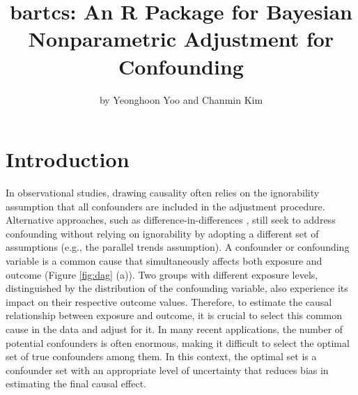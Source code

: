 \title{bartcs: An R Package for Bayesian Nonparametric Adjustment for Confounding}
\author{by Yeonghoon Yoo and Chanmin Kim}

\maketitle


\section{Introduction}


In observational studies, drawing causality often relies on the ignorability assumption \citep{rosenbaum_central_1983} that all confounders are included in the adjustment procedure. Alternative approaches, such as difference-in-differences \citep{abadie2005semiparametric}, still seek to address confounding without relying on ignorability by adopting a different set of assumptions (e.g., the parallel trends assumption). A confounder or confounding variable is a common cause that simultaneously affects both exposure and outcome (Figure \ref{fig:dag} (a)). Two groups with different exposure levels, distinguished by the distribution of the confounding variable, also experience its impact on their respective outcome values. Therefore, to estimate the causal relationship between exposure and outcome, it is crucial to select this common cause in the data and adjust for it. In many recent applications, the number of potential confounders is often enormous, making it difficult to select the optimal set of true confounders among them. In this context, the optimal set is a confounder set with an appropriate level of uncertainty that reduces bias in estimating the final causal effect. 

